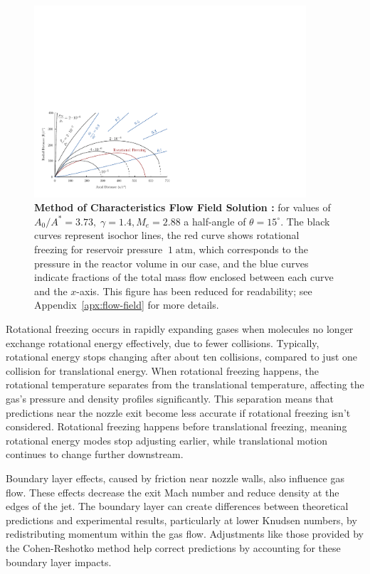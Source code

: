 		\begin{figure}[H]
			\centering
		    \includegraphics[width=0.9\textwidth]{src/03_analytical-work/fig_velocity-distribution-reduced.pdf}
			\caption[Method of Characteristics Flow Field Solution \cite{Cassanova1965}]{
				\textbf{Method of Characteristics Flow Field Solution \cite{Cassanova1965}:}
				for values of $A_0/A^* = 3.73,\;\gamma=1.4,M_e =2.88$ a half-angle of $\theta = 15^\circ$.
				The black curves represent isochor lines, the red curve shows rotational freezing for reservoir pressure $~1\;\text{atm}$, which corresponds to the pressure in the reactor volume in our case, and the blue curves indicate fractions of the total mass flow enclosed between each curve and the $x$-axis. 
				This figure has been reduced for readability; see Appendix~\ref{apx:flow-field} for more details.
			}
			\label{fig:velocity-distribution-reduced}
		\end{figure}

		Rotational freezing occurs in rapidly expanding gases when molecules no longer exchange rotational energy effectively, due to fewer collisions.
		Typically, rotational energy stops changing after about ten collisions, compared to just one collision for translational energy.
		When rotational freezing happens, the rotational temperature separates from the translational temperature, affecting the gas's pressure and density profiles significantly.
		This separation means that predictions near the nozzle exit become less accurate if rotational freezing isn't considered.
		Rotational freezing happens before translational freezing, meaning rotational energy modes stop adjusting earlier, while translational motion continues to change further downstream.

		Boundary layer effects, caused by friction near nozzle walls, also influence gas flow.
		These effects decrease the exit Mach number and reduce density at the edges of the jet.
		The boundary layer can create differences between theoretical predictions and experimental results, particularly at lower Knudsen numbers, by redistributing momentum within the gas flow.
		Adjustments like those provided by the Cohen-Reshotko method help correct predictions by accounting for these boundary layer impacts.

